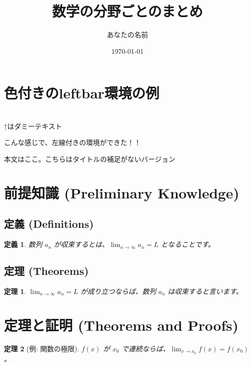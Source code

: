 \documentclass[a4paper, 12pt]{article}
\title{数学の分野ごとのまとめ}
\author{あなたの名前}
\date{\today}
\newtheorem{defi}{定義}[section]  %
\newtheorem{theorem}{定理}[section]     %
\begin{document}
\maketitle
\tableofcontents  %

\newpage

\section{色付きのleftbar環境の例}

\setcounter{section}{1}

\begin{definition}[(Matrix)]
\lipsum[2]\\
↑はダミーテキスト
\end{definition}

\noindent こんな感じで、左線付きの環境ができた！！

\begin{definition}
本文はここ。こちらはタイトルの補足がないバージョン
\end{definition}

\section{前提知識 (Preliminary Knowledge)}
\subsection{定義 (Definitions)}
\begin{defi}
    数列 $a_n$ が収束するとは、$\lim_{n \to \infty} a_n = L$ となることです。
\end{defi}

\subsection{定理 (Theorems)}
\begin{theorem}
    $\lim_{n \to \infty} a_n = L$ が成り立つならば、数列 $a_n$ は収束すると言います。
\end{theorem}

\section{定理と証明 (Theorems and Proofs)}
\begin{theorem}[例: 関数の極限]
    $f(x)$ が $x_0$ で連続ならば、$\lim_{x \to x_0} f(x) = f(x_0)$。
\end{theorem}
\end{document}
